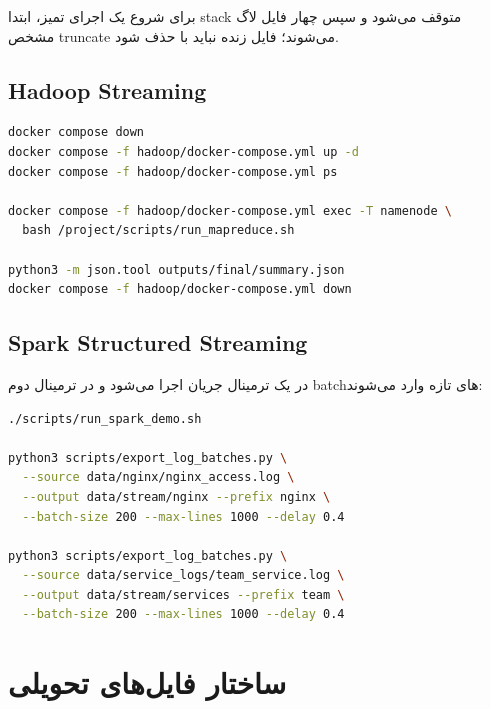 \documentclass[12pt,a4paper]{article}
\begin{document}
برای شروع یک اجرای تمیز، ابتدا stack متوقف می‌شود و سپس چهار فایل لاگ مشخص truncate می‌شوند؛ فایل زنده نباید با  حذف شود.

\subsection{Hadoop Streaming}

\begin{latin}
\begin{lstlisting}[language=bash]
docker compose down
docker compose -f hadoop/docker-compose.yml up -d
docker compose -f hadoop/docker-compose.yml ps

docker compose -f hadoop/docker-compose.yml exec -T namenode \
  bash /project/scripts/run_mapreduce.sh

python3 -m json.tool outputs/final/summary.json
docker compose -f hadoop/docker-compose.yml down
\end{lstlisting}
\end{latin}

\subsection{Spark Structured Streaming}

در یک ترمینال جریان اجرا می‌شود و در ترمینال دوم batchهای تازه وارد می‌شوند:

\begin{latin}
\begin{lstlisting}[language=bash]
./scripts/run_spark_demo.sh

python3 scripts/export_log_batches.py \
  --source data/nginx/nginx_access.log \
  --output data/stream/nginx --prefix nginx \
  --batch-size 200 --max-lines 1000 --delay 0.4

python3 scripts/export_log_batches.py \
  --source data/service_logs/team_service.log \
  --output data/stream/services --prefix team \
  --batch-size 200 --max-lines 1000 --delay 0.4
\end{lstlisting}
\end{latin}

\section{ساختار فایل‌های تحویلی}
\end{document}
